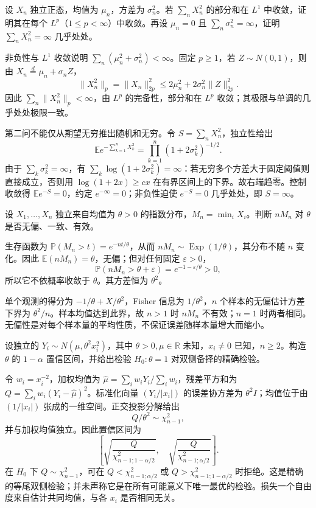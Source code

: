 \documentclass[UTF8,12pt,a4paper,fontset=fandol]{ctexbook}
\newcommand{\E}{\mathbb E}
\newcommand{\PP}{\mathbb P}
\begin{document}
\begin{example}[原题3：正态平方级数的可积性]\label{yau:2015-3}
设 $X_n$ 独立正态，均值为 $\mu_n$，方差为 $\sigma_n^2$。若 $\sum_nX_n^2$ 的部分和在 $L^1$ 中收敛，证明其在每个 $L^p$（$1\le p<\infty$）中收敛。再设 $\mu_n=0$ 且 $\sum_n\sigma_n^2=\infty$，证明 $\sum_nX_n^2=\infty$ 几乎处处。
\end{example}
\begin{solve}
非负性与 $L^1$ 收敛说明 $\sum_n(\mu_n^2+\sigma_n^2)<\infty$。固定 $p\ge1$，若 $Z\sim N(0,1)$，则由 $X_n\overset d=\mu_n+\sigma_nZ$，
\[
\|X_n^2\|_p=\|X_n\|_{2p}^2\le2\mu_n^2+2\sigma_n^2\|Z\|_{2p}^2.
\]
因此 $\sum_n\|X_n^2\|_p<\infty$，由 $L^p$ 的完备性，部分和在 $L^p$ 收敛；其极限与单调的几乎处处极限一致。

第二问不能仅从期望无穷推出随机和无穷。令 $S=\sum_nX_n^2$，独立性给出
\[
\E e^{-\sum_{k=1}^nX_k^2}=\prod_{k=1}^n(1+2\sigma_k^2)^{-1/2}.
\]
由于 $\sum_k\sigma_k^2=\infty$，有 $\sum_k\log(1+2\sigma_k^2)=\infty$：若无穷多个方差大于固定阈值则直接成立，否则用 $\log(1+2x)\ge c x$ 在有界区间上的下界。故右端趋零。控制收敛得 $\E e^{-S}=0$，约定 $e^{-\infty}=0$；非负性迫使 $e^{-S}=0$ 几乎处处，即 $S=\infty$。
\end{solve}

\begin{example}[原题4：指数样本最小值的估计性质]\label{yau:2015-4}
设 $X_1,\ldots,X_n$ 独立来自均值为 $\theta>0$ 的指数分布，$M_n=\min_iX_i$。判断 $nM_n$ 对 $\theta$ 是否无偏、一致、有效。
\end{example}
\begin{solve}
生存函数为 $\PP(M_n>t)=e^{-nt/\theta}$，从而 $nM_n\sim\operatorname{Exp}(1/\theta)$，其分布不随 $n$ 变化。因此 $\E(nM_n)=\theta$，无偏；但对任何固定 $\varepsilon>0$，
\[
\PP(nM_n>\theta+\varepsilon)=e^{-1-\varepsilon/\theta}>0,
\]
所以它不依概率收敛于 $\theta$。其方差恒为 $\theta^2$。

单个观测的得分为 $-1/\theta+X/\theta^2$，Fisher 信息为 $1/\theta^2$，$n$ 个样本的无偏估计方差下界为 $\theta^2/n$。样本均值达到此界，故 $n>1$ 时 $nM_n$ 不有效；$n=1$ 时两者相同。无偏性是对每个样本量的平均性质，不保证误差随样本量增大而缩小。
\end{solve}

\begin{example}[原题5：已知相对方差的正态模型]\label{yau:2015-5}
设独立的 $Y_i\sim N(\mu,\theta^2x_i^2)$，其中 $\theta>0,\mu\in\mathbb R$ 未知，$x_i\ne0$ 已知，$n\ge2$。构造 $\theta$ 的 $1-\alpha$ 置信区间，并给出检验 $H_0:\theta=1$ 对双侧备择的精确检验。
\end{example}
\begin{solve}
令 $w_i=x_i^{-2}$，加权均值为 $\widehat\mu=\sum_iw_iY_i/\sum_iw_i$，残差平方和为 $Q=\sum_iw_i(Y_i-\widehat\mu)^2$。标准化向量 $(Y_i/|x_i|)$ 的误差协方差为 $\theta^2I$；均值位于由 $(1/|x_i|)$ 张成的一维空间。正交投影分解给出
\[
Q/\theta^2\sim\chi^2_{n-1},
\]
并与加权均值独立。因此置信区间为
\[
\left[\sqrt{\frac Q{\chi^2_{n-1;1-\alpha/2}}},\quad
\sqrt{\frac Q{\chi^2_{n-1;\alpha/2}}}\right].
\]
在 $H_0$ 下 $Q\sim\chi^2_{n-1}$，可在 $Q<\chi^2_{n-1;\alpha/2}$ 或 $Q>\chi^2_{n-1;1-\alpha/2}$ 时拒绝。这是精确的等尾双侧检验；并未声称它是在所有可能意义下唯一最优的检验。损失一个自由度来自估计共同均值，与各 $x_i$ 是否相同无关。
\end{solve}
\end{document}
